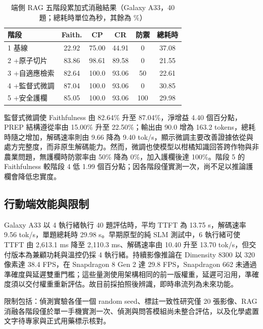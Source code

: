 \documentclass[10pt,twocolumn,a4paper]{article}
\begin{document}
\begin{table}[t]
\centering
{}\footnotesize
\setlength{\tabcolsep}{3pt}
\begin{tabular}{|l|c|c|c|c|c|}
\hline
\textbf{階段} & \textbf{Faith.} & \textbf{CP} & \textbf{CR} & \textbf{防禦} & \textbf{總耗時} \\
\hline
1 基線 & 22.92 & 75.00 & 44.91 & 0 & 37.08 \\
\hline
2 +原子切片 & 83.86 & 98.61 & 89.58 & 0 & 21.55 \\
\hline
3 +自適應檢索 & 82.64 & 100.0 & 93.06 & 50 & 22.61 \\
\hline
4 +監督式微調 & 87.04 & 100.0 & 93.06 & 0 & 30.85 \\
\hline
5 +安全護欄 & 85.05 & 100.0 & 93.06 & 100 & 29.98 \\
\hline
\end{tabular}
\caption{端側 RAG 五階段累加式消融結果（Galaxy A33，40 題；總耗時單位為秒，其餘為 \%）}
\end{table}

監督式微調使 Faithfulness 由 82.64\% 升至 87.04\%，淨增益 4.40 個百分點，PREP 結構遵從率由 15.00\% 升至 22.50\%；輸出由 90.0 增為 163.2 tokens，總耗時隨之增加，解碼速率則由 9.66 降為 9.40 tok/s，顯示微調主要改善證據依從與處方完整度，而非原生解碼能力。然而，微調也使模型以柑橘知識回答跨作物與非農業問題，無護欄時防禦率由 50\% 降為 0\%，加入護欄後達 100\%。階段 5 的 Faithfulness 較階段 4 低 1.99 個百分點；因各階段僅實測一次，尚不足以推論護欄會降低忠實度。

\subsection{行動端效能與限制}
Galaxy A33 以 4 執行緒執行 40 題評估時，平均 TTFT 為 13.75 s，解碼速率 9.56 tok/s，單題總耗時 29.98 s。早期原型的純 SLM 測試中，6 執行緒可使 TTFT 由 2,613.1 ms 降至 2,110.3 ms、解碼速率由 10.40 升至 13.70 tok/s，但交付版本為兼顧功耗與溫控仍採 4 執行緒。持續影像推論在 Dimensity 8300 以 320 像素達 38.4 FPS，在 Snapdragon 8 Gen 2 達 29.8 FPS，Snapdragon 662 未通過準確度與延遲雙重門檻；這些量測使用架構相同的前一版權重，延遲可沿用，準確度須以交付權重重新評估。故目前採拍照後辨識，即時串流列為未來功能。

限制包括：偵測實驗各僅一個 random seed、標註一致性研究僅 20 張影像、RAG 消融各階段僅於單一手機實測一次、偵測與問答模組尚未整合評估，以及化學處置文字待專家與正式用藥標示核對。
\end{document}
